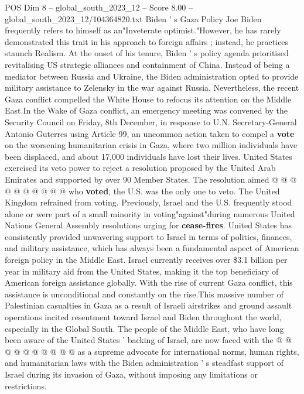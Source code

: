 \begin{textsample}{POS Dim 8 – global\_south\_2023\_12 – Score 8.00 – global\_south\_2023\_12/104364820.txt}  \label{ex:f8_pos_230}
Biden ' s Gaza Policy Joe Biden frequently refers to himself as an"Inveterate optimist."However, he has rarely demonstrated this trait in his approach to foreign affairs ; instead, he practices staunch Realism.
At the onset of his tenure, Biden ' s policy agenda prioritised revitalising US strategic alliances and containment of China.
Instead of being a mediator between Russia and Ukraine, the Biden administration opted to provide military assistance to Zelensky in the war against Russia.
Nevertheless, the recent Gaza conflict compelled the White House to refocus its attention on the Middle East.In the Wake of Gaza conflict, an emergency meeting was convened by the Security Council on Friday, 8th December, in response to U.N.
Secretary-General Antonio Guterres using Article 99, an uncommon action taken to compel a \textbf{vote} on the worsening humanitarian crisis in Gaza, where two million individuals have been displaced, and about 17,000 individuals have lost their lives.
United States exercised its veto power to reject a resolution proposed by the United Arab Emirates and supported by over 90 Member States.
The resolution aimed @ @ @ @ @ @ @ @ @ @ who \textbf{voted}, the U.S. was the only one to veto.
The United Kingdom refrained from voting.
Previously, Israel and the U.S. frequently stood alone or were part of a small minority in voting"against"during numerous United Nations General Assembly resolutions urging for \textbf{cease-fires}.
United States has consistently provided unwavering support to Israel in terms of politics, finances, and military assistance, which has always been a fundamental aspect of American foreign policy in the Middle East.
Israel currently receives over \$3.1 billion per year in military aid from the United States, making it the top beneficiary of American foreign assistance globally.
With the rise of current Gaza conflict, this assistance is unconditional and constantly on the rise.This massive number of Palestinian casualties in Gaza as a result of Israeli airstrikes and ground assault operations incited resentment toward Israel and Biden throughout the world, especially in the Global South.
The people of the Middle East, who have long been aware of the United States ' backing of Israel, are now faced with the @ @ @ @ @ @ @ @ @ @ as a supreme advocate for international norms, human rights, and humanitarian laws with the Biden administration ' s steadfast support of Israel during its invasion of Gaza, without imposing any limitations or restrictions.

\end{textsample}
